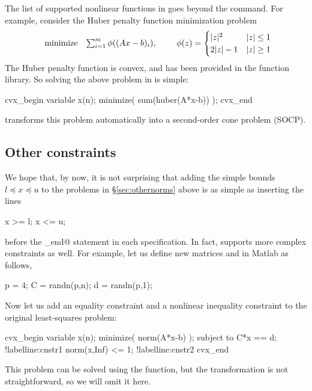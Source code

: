 \documentclass[12pt]{article}
\begin{document}
The list of supported nonlinear functions in \cvx 
goes beyond the \verb@norm@ command.
For example, consider the Huber penalty function minimization problem
\begin{equation}
	\begin{array}{ll}
		\text{minimize} & \sum_{i=1}^m \phi( (Ax-b)_i ),
	\end{array} \qquad
	\phi(z) =\begin{cases}  |z|^2 & |z|\leq 1 \\ 2|z|-1 & |z|\geq 1  \end{cases}
\end{equation}
The Huber penalty function is convex, and has been provided in the \cvx
function library. So solving the above problem in \cvx is simple:
\begin{code2}[firstnumber=204]
	cvx_begin
	    variable x(n);
	    minimize( sum(huber(A*x-b)) );
	cvx_end
\end{code2}
\cvx transforms this problem automatically into a second-order cone problem
(SOCP).

\subsection{Other constraints}
\label{sec:constraints}

We hope that, by now, it is not surprising that adding the simple bounds 
$l\preceq x\preceq u$ to the problems in \S\ref{sec:othernorms} above
is as simple as inserting the lines
\begin{code}
	x >= l;
	x <= u;
\end{code}
before the \verb@cvx_end@
statement in each \cvx specification. In fact, 
\cvx supports more complex constraints as well.
For example, let us define new matrices \verb@C@ and \verb@d@ in Matlab
as follows,
\begin{code2}[firstnumber=227]
	p = 4;
	C = randn(p,n);
	d = randn(p,1);
\end{code2}
Now let us add an equality constraint and a nonlinear inequality
constraint to the original least-squares problem:
\begin{code2}[firstnumber=232]
	cvx_begin
	    variable x(n);
	    minimize( norm(A*x-b) );
	    subject to
	        C*x == d;		!label{line:cnstr1}
	        norm(x,Inf) <= 1;	!label{line:cnstr2}
	cvx_end
\end{code2}
This problem can be solved using the \verb@quadprog@ function,
but the transformation is not straightforward, so
we will omit it here.
\end{document}
